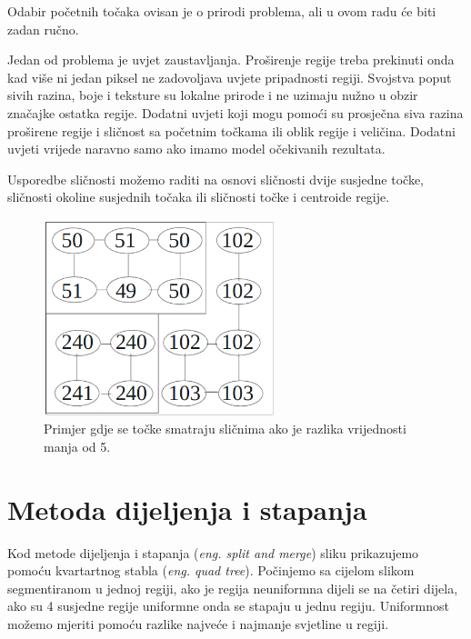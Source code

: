 \documentclass[lmodern, utf8, seminar]{fer}
\begin{document}
Odabir početnih točaka ovisan je o prirodi problema, ali u ovom radu će biti zadan ručno.

Jedan od problema je uvjet zaustavljanja. Proširenje regije treba prekinuti onda kad više ni jedan piksel ne zadovoljava uvjete pripadnosti regiji. Svojstva poput sivih razina, boje i teksture su lokalne prirode i ne uzimaju nužno u obzir značajke ostatka regije. Dodatni uvjeti koji mogu pomoći su prosječna siva razina proširene regije i sličnost sa početnim točkama ili oblik regije i veličina. Dodatni uvjeti vrijede naravno samo ako imamo model očekivanih rezultata.

Usporedbe sličnosti možemo raditi na osnovi sličnosti dvije susjedne točke, sličnosti okoline susjednih točaka ili sličnosti točke i centroide regije.

\begin{figure}[H]
	\centering
	\includegraphics[width=0.6\textwidth]{similarity}
	\caption{Primjer gdje se točke smatraju sličnima ako je razlika vrijednosti manja od 5.}
	\label{fig:similarity}
\end{figure}

\section{Metoda dijeljenja i stapanja}

Kod metode dijeljenja i stapanja ({\it eng. split and merge}) sliku prikazujemo pomoću kvartartnog stabla ({\it eng. quad tree}). Počinjemo sa cijelom slikom segmentiranom u jednoj regiji, ako je regija neuniformna dijeli se na četiri dijela, ako su 4 susjedne regije uniformne onda se stapaju u jednu regiju.
Uniformnost možemo mjeriti pomoću razlike najveće i najmanje svjetline u regiji.
\end{document}
